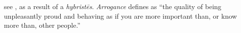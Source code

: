 \item[Arrogance,]

see , as a result of a \emph{hybristēs}. \emph{Arrogance} defines as ``the quality of being unpleasantly proud and behaving as if you are more important than, or know more than, other people.''
